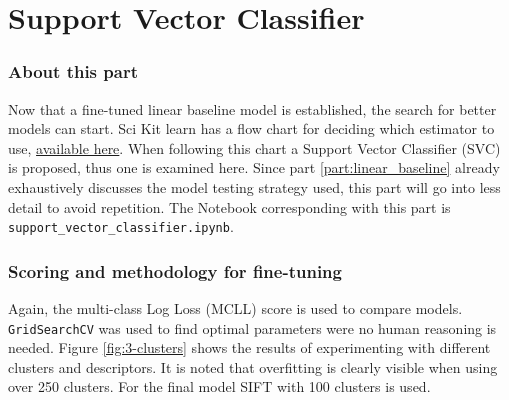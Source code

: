 \part{Support Vector Classifier}
\label{part:svc}


\section{About this part}
\label{section:SVC_about_part}

Now that a fine-tuned linear baseline model is established, the search for better models can start.
Sci Kit learn has a flow chart for deciding which estimator to use, \href{https://scikit-learn.org/stable/tutorial/machine_learning_map/index.html}{available here}.
When following this chart a Support Vector Classifier (SVC) is proposed, thus one is examined here.
Since part \ref{part:linear_baseline} already exhaustively discusses the model testing strategy used, this part will go into less detail to avoid repetition. 
The Notebook corresponding with this part is \texttt{support\_vector\_classifier.ipynb}.



\section{Scoring and methodology for fine-tuning}
\label{section:SVC_methodology}

Again, the multi-class Log Loss (MCLL) score is used to compare models.
\texttt{GridSearchCV} was used to find optimal parameters were no human reasoning is needed.
Figure \ref{fig:3-clusters} shows the results of experimenting with different clusters and descriptors.
It is noted that overfitting is clearly visible when using over 250 clusters.
For the final model SIFT with 100 clusters is used.

